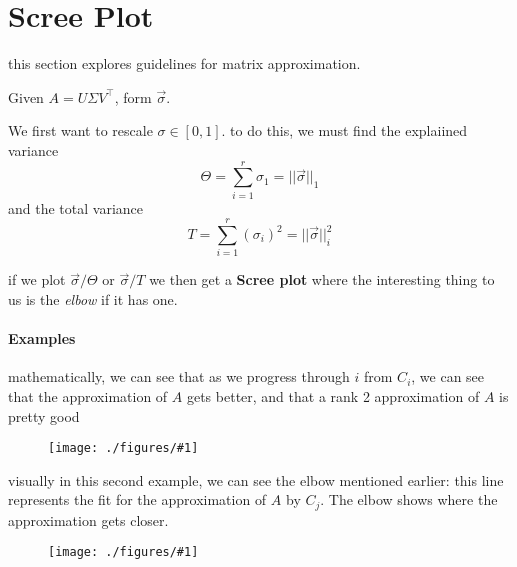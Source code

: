 \documentclass[12pt]{book}
\newcommand{\incimg}[2]{%
       \begin{figure}[h]
               \centering
               \texttt{[image: ./figures/\#1]}
       \end{figure}
}
\begin{document}
\section*{Scree Plot}
this section explores guidelines for matrix approximation. 

Given $A = U\Sigma V^\top$, form $\vec \sigma$.

We first want to rescale $\sigma \in [0,1]$. to do this, we must find the explaiined variance
\[\Theta = \sum^r_{i=1}\sigma_1 = ||\vec\sigma||_1\]
and the total variance
\[T = \sum^r_{i=1}(\sigma_i)^2 = ||\vec\sigma||^2_i\]

\pagebreak
if we plot $\vec\sigma / \Theta$ or $\vec\sigma/T$ we then get a \textbf{Scree plot}
where the interesting thing to us is the \textit{elbow} if it has one.

\paragraph{Examples}
mathematically, we can see that 
as we progress through $i$ from $C_i$, we can see that the approximation of $A$ gets better, and
that a rank 2 approximation of $A$ is pretty good
\incimg{ex1}{0.5}

visually in this second example, we can see the elbow mentioned earlier:
this line represents the fit for the approximation of $A$ by $C_j$. The elbow shows where
the approximation gets closer.
\incimg{ex2}{0.5}
\end{document}
